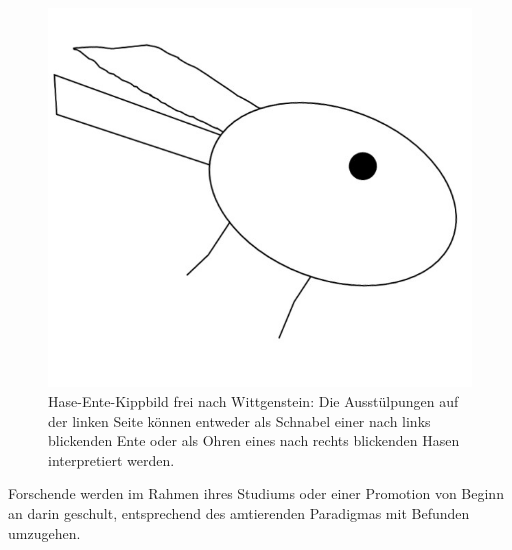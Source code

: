 \documentclass[
  letterpaper,
  DIV=11,
  numbers=noendperiod]{scrreprt}
\begin{document}
\begin{figure}[H]

{\centering \includegraphics{images/entehase-01.jpg}

}

\caption{Hase-Ente-Kippbild frei nach Wittgenstein: Die Ausstülpungen
auf der linken Seite können entweder als Schnabel einer nach links
blickenden Ente oder als Ohren eines nach rechts blickenden Hasen
interpretiert werden.}

\end{figure}%

Forschende werden im Rahmen ihres Studiums oder einer Promotion von
Beginn an darin geschult, entsprechend des amtierenden Paradigmas mit
Befunden umzugehen.
\end{document}
